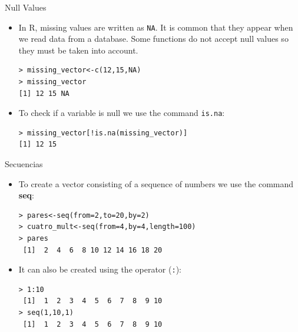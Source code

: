 \documentclass[handout]{beamer}
\begin{document}
\begin{frame}[fragile]{Null Values}
\scriptsize{
\begin{itemize}
\item In R, missing values are written as \verb+NA+. It is common that they appear when we read data from a database. Some functions do not accept null values so they must be taken into account.
\begin{verbatim}
> missing_vector<-c(12,15,NA)
> missing_vector
[1] 12 15 NA
\end{verbatim}

\item To check if a variable is null we use the command \verb+is.na+:
\begin{verbatim}
> missing_vector[!is.na(missing_vector)]
[1] 12 15 
\end{verbatim}



\end{itemize}

 }
 
 
\end{frame}




\begin{frame}[fragile]{Secuencias}
 \scriptsize{
 
 \begin{itemize}
  \item To create a vector consisting of a sequence of numbers we use the command \textbf{seq}:
 
 \begin{verbatim}
> pares<-seq(from=2,to=20,by=2)
> cuatro_mult<-seq(from=4,by=4,length=100)
> pares
 [1]  2  4  6  8 10 12 14 16 18 20
 \end{verbatim} 
 \item It can also be created using the operator (\verb+:+):
 \begin{verbatim}
> 1:10
 [1]  1  2  3  4  5  6  7  8  9 10 
> seq(1,10,1)
 [1]  1  2  3  4  5  6  7  8  9 10
 \end{verbatim} 
 \end{itemize}
 
 }
\end{frame}
\end{document}

